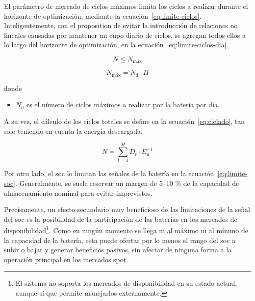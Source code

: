 El parámetro de mercado de ciclos máximos limita los ciclos a realizar durante el horizonte de optimización, mediante la ecuación~\ref{eq:limite-ciclos}. Inteligentemente, con el proposition de evitar la introducción de relaciones no lineales causadas por mantener un cupo diario de ciclos, se agregan todos ellos a lo largo del horizonte de optimización, en la ecuación~\ref{eq:limite-ciclos-dia}.

\begin{equation}%
  \label{eq:limite-ciclos}
  N \le N_{\text{máx}}
\end{equation}

\begin{samepage}

  \begin{equation}%
    \label{eq:limite-ciclos-dia}
    N_{\text{máx}} = N_{\mathrm{d}} \cdot H
  \end{equation}

  donde

  \begin{itemize}

    \item \( N_{\mathrm{d}} \) es el número de ciclos máximos a realizar por la batería por día.

  \end{itemize}

\end{samepage}

A su vez, el cálculo de los ciclos totales se define en la ecuación~\ref{eq:ciclado}, tan solo teniendo en cuenta la energía descargada.

\begin{equation}%
  \label{eq:ciclado}
  N = \sum_{t = 1}^{H} D_{t} \cdot E_{\mathrm{n}}^{-1}
\end{equation}

Por otro lado, el \gls{soc} lo limitan las señales de la batería en la ecuación~\ref{eq:limite-soc}. Generalmente, se suele reservar un margen de 5--10 \% de la capacidad de almacenamiento nominal para evitar imprevistos.

Precisamente, un efecto secundario muy beneficioso de las limitaciones de la señal del \gls{soc} es la posibilidad de la participación de las baterías en los mercados de disponibilidad\footnote{El sistema no soporta los mercados de disponibilidad en su estado actual, aunque sí que permite manejarlos externamente.}. Como en ningún momento se llega ni al máximo ni al mínimo de la capacidad de la batería, esta puede ofertar por lo menos el rango del \gls{soc} a subir o bajar y generar beneficios pasivos, sin afectar de ninguna forma a la operación principal en los mercados spot.

